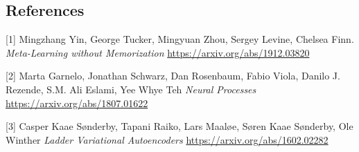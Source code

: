 \documentclass[12pt]{article}
\begin{document}
    \newpage
    \subsection*{References}

    [1]
    Mingzhang Yin, George Tucker, Mingyuan Zhou, Sergey Levine, Chelsea Finn.
    \textit{Meta-Learning without Memorization}
    \url{https://arxiv.org/abs/1912.03820}

    [2]
    Marta Garnelo, Jonathan Schwarz, Dan Rosenbaum, Fabio Viola, Danilo J. Rezende, S.M. Ali Eslami, Yee Whye Teh
    \textit{Neural Processes}
    \url{https://arxiv.org/abs/1807.01622}

    [3]
    Casper Kaae Sønderby, Tapani Raiko, Lars Maaløe, Søren Kaae Sønderby, Ole Winther
    \textit{Ladder Variational Autoencoders}
    \url{https://arxiv.org/abs/1602.02282}
\end{document}
